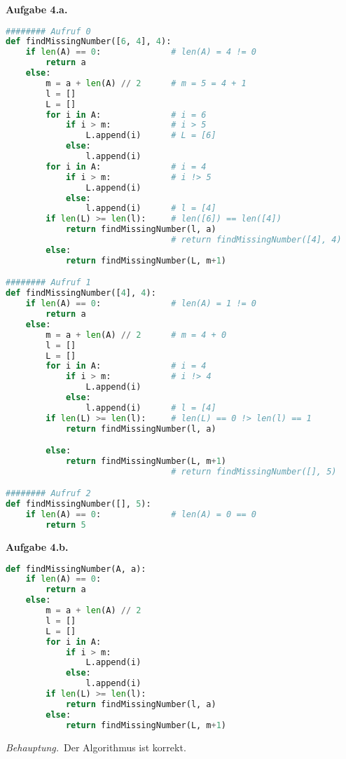 \documentclass[12pt]{extarticle}
\newcommand{\aufgn}[1]{\textbf{Aufgabe #1.}}
\newcommand{\beh}{\textit{Behauptung.}\ }
\begin{document}
\aufgn{4.a}
\begin{lstlisting}[language=Python]
######## Aufruf 0
def findMissingNumber([6, 4], 4):
    if len(A) == 0:              # len(A) = 4 != 0
        return a
    else:
        m = a + len(A) // 2      # m = 5 = 4 + 1
        l = []
        L = []
        for i in A:              # i = 6
            if i > m:            # i > 5
                L.append(i)      # L = [6]
            else:
                l.append(i)
        for i in A:              # i = 4
            if i > m:            # i !> 5
                L.append(i)
            else:
                l.append(i)      # l = [4]
        if len(L) >= len(l):     # len([6]) == len([4])
            return findMissingNumber(l, a)
                                 # return findMissingNumber([4], 4)
        else:
            return findMissingNumber(L, m+1)

######## Aufruf 1
def findMissingNumber([4], 4):
    if len(A) == 0:              # len(A) = 1 != 0
        return a
    else:
        m = a + len(A) // 2      # m = 4 + 0
        l = []
        L = []
        for i in A:              # i = 4
            if i > m:            # i !> 4
                L.append(i)
            else:
                l.append(i)      # l = [4]
        if len(L) >= len(l):     # len(L) == 0 !> len(l) == 1
            return findMissingNumber(l, a)

        else:
            return findMissingNumber(L, m+1)
                                 # return findMissingNumber([], 5)

######## Aufruf 2
def findMissingNumber([], 5):
    if len(A) == 0:              # len(A) = 0 == 0
        return 5
\end{lstlisting}
\newpage
\aufgn{4.b}
\begin{lstlisting}[language=Python]
def findMissingNumber(A, a):
    if len(A) == 0:
        return a
    else:
        m = a + len(A) // 2
        l = []
        L = []
        for i in A:
            if i > m:
                L.append(i)
            else:
                l.append(i)
        if len(L) >= len(l):
            return findMissingNumber(l, a)
        else:
            return findMissingNumber(L, m+1)
\end{lstlisting}
\beh Der Algorithmus ist korrekt.
\end{document}
